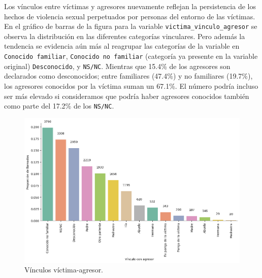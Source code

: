 \documentclass[10 pt]{article}
\begin{document}
Los vínculos entre víctimas y agresores nuevamente reflejan la persistencia de los hechos de violencia sexual perpetuados por personas del entorno de las víctimas. En el gráfico de barras de la figura  para la variable \texttt{victima\_vinculo\_agresor} se observa la distribución en las diferentes categorías vinculares. Pero además la tendencia se evidencia aún más al reagrupar las categorías de la variable en \texttt{Conocido familiar}, \texttt{Conocido no familiar} (categoría ya presente en la variable original) \texttt{Desconocido}, y \texttt{NS/NC}. Mientras que 15.4\% de los agresores son declarados como desconocidos; entre familiares (47.4\%) y no familiares (19.7\%), los agresores conocidos por la víctima suman un 67.1\%. El número podría incluso ser más elevado si consideramos que podría haber agresores conocidos también como parte del 17.2\% de los \texttt{NS/NC}.



\begin{figure}[H]
    \begin{center}
    \includegraphics[scale=.4]{images/latex_vinculo_agr_victima.png}
    \caption{Vínculos víctima-agresor.}
    \label{vinculoagresor}
    \end{center}
    \end{figure}
\end{document}
